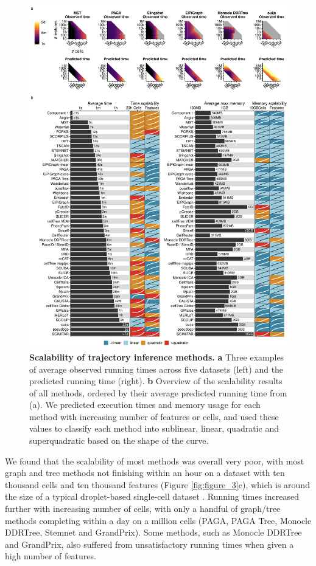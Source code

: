 \begin{figure}[htb!]
	\centering\includegraphics[width=0.9\linewidth]{fig/supfigure_4.pdf}
	\caption{
		\textbf{Scalability of trajectory inference methods.}
		\textbf{a} Three examples of average observed running times across five datasets (left) and the predicted running time (right). \textbf{b} Overview of the scalability results of all methods, ordered by their average predicted running time from (a). We predicted execution times and memory usage for each method with increasing number of features or cells, and used these values to classify each method into sublinear, linear, quadratic and superquadratic based on the shape of the curve.
	}
	\label{fig:supfigure_4}
\end{figure}

We found that the scalability of most methods was overall very poor, with most graph and tree methods not finishing within an hour on a dataset with ten thousand cells and ten thousand features (Figure \ref{fig:figure_3}c), which is around the size of a typical droplet-based single-cell dataset \cite{svensson_exponentialscalingsinglecell_2018}. Running times increased further with increasing number of cells, with only a handful of graph/tree methods completing within a day on a million cells (PAGA, PAGA Tree, Monocle DDRTree, Stemnet and GrandPrix). Some methods, such as Monocle DDRTree and GrandPrix, also suffered from unsatisfactory running times when given a high number of features.

